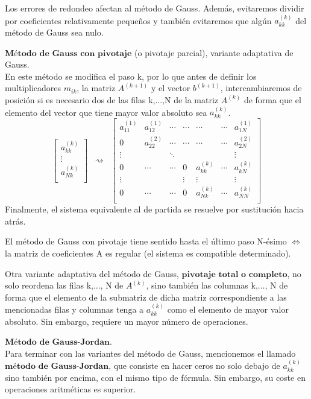 \begin{nlist}
			Los errores de redondeo afectan al método de Gauss. Además, evitaremos dividir por coeficientes relativamente pequeños y también evitaremos que algún $a_{kk}^{(k)}$ del método de Gauss sea nulo.
		\item $\textbf{Método de Gauss con pivotaje}$ (o pivotaje parcial), variante adaptativa de Gauss.\\
		En este método se modifica el paso k, por lo que antes de definir los multiplicadores $m_{ik}$, la matriz $A^{(k+1)}$ y el vector $b^{(k+1)}$, intercambiaremos de posición si es necesario dos de las filas k,...,N de la matriz $A^{(k)}$ de forma que el elemento del vector que tiene mayor valor absoluto sea $a_{kk}^{(k)}$.
		\[
		\begin{bmatrix}
		a_{kk}^{(k)} \\
		\vdots \\
		a_{Nk}^{(k)} \\
		\end{bmatrix}
		\; \; \rightsquigarrow \; \;
		\begin{bmatrix}
		a_{11}^{(1)} & a_{12}^{(1)} & \cdots & \cdots & \cdots & \cdots & a_{1N}^{(1)} \\
		0 & a_{22}^{(2)} & \cdots & \cdots & \cdots & \cdots & a_{2N}^{(2)} \\
		\vdots & & \ddots & & & & \vdots \\
		0 & \cdots & \cdots & 0 & a_{kk}^{(k)} & \cdots & a_{kN}^{(k)} \\
		\vdots & & & \vdots & \vdots & & \vdots \\
		0 & \cdots & \cdots & 0 & a_{Nk}^{(k)} & \cdots & a_{NN}^{(k)}\\
		\end{bmatrix}
		\]
		Finalmente, el sistema equivalente al de partida se resuelve por sustitución hacia atrás.
			\begin{nota}
			El método de Gauss con pivotaje tiene sentido hasta el último paso N-ésimo $\Leftrightarrow$ la matriz de coeficientes A es regular (el sistema es compatible determinado).
			\end{nota}
			
			\begin{nota}
			Otra variante adaptativa del método de Gauss, $\textbf{pivotaje total o completo}$, no solo
reordena las filas k,..., N de $A^{(k)}$, sino también las columnas k,..., N de forma
que el elemento de la submatriz de dicha matriz correspondiente a las
mencionadas filas y columnas tenga a $a_{kk}^{(k)}$ como el elemento de mayor valor absoluto. Sin embargo, requiere un mayor número de operaciones.
			\end{nota}
		
		\item $\textbf{Método de Gauss-Jordan}$.\\
		Para terminar con las variantes del método de Gauss, mencionemos el llamado $\textbf{método}$ $\textbf{de}$ $\textbf{Gauss-Jordan}$, que consiste en hacer ceros no solo debajo de $a_{kk}^{(k)}$ sino
también por encima, con el mismo tipo de fórmula. Sin embargo, su coste en operaciones aritméticas es superior.
		\end{nlist}
		
